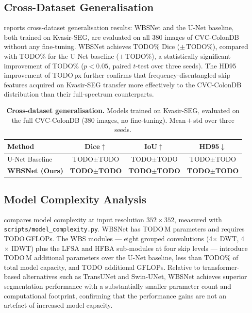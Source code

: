 \documentclass[journal]{IEEEtran}
\begin{document}
\subsection{Cross-Dataset Generalisation}\label{sec:exp:generalisation}

 reports cross-dataset generalisation results:
WBSNet and the U-Net baseline, both trained on Kvasir-SEG, are evaluated
on all 380 images of CVC-ColonDB without any fine-tuning.
WBSNet achieves TODO\% Dice ($\pm$\,TODO\%), compared with TODO\% for the
U-Net baseline ($\pm$\,TODO\%), a statistically significant improvement of
TODO\% ($p < 0.05$, paired $t$-test over three seeds).
The HD95 improvement of TODO\,px further confirms that frequency-disentangled
skip features acquired on Kvasir-SEG transfer more effectively to the
CVC-ColonDB distribution than their full-spectrum counterparts.

\begin{table}[t]
  \centering
  \caption{\textbf{Cross-dataset generalisation.}
    Models trained on Kvasir-SEG, evaluated on the full CVC-ColonDB
    (380 images, no fine-tuning).
    Mean\,$\pm$\,std over three seeds.}
  \label{tab:generalisation}
  \begin{tabular}{@{}lccc@{}}
    \toprule
    Method & Dice$\uparrow$ & IoU$\uparrow$ & HD95$\downarrow$ \\
    \midrule
    U-Net Baseline
        & TODO$\pm$TODO & TODO$\pm$TODO & TODO$\pm$TODO \\
    \textbf{WBSNet (Ours)}
        & \textbf{TODO$\pm$TODO}
        & \textbf{TODO$\pm$TODO}
        & \textbf{TODO$\pm$TODO} \\
    \bottomrule
  \end{tabular}
\end{table}

\subsection{Model Complexity Analysis}\label{sec:exp:complexity}

 compares model complexity at input resolution
$352 \times 352$, measured with \texttt{scripts/model\_complexity.py}.
WBSNet has TODO\,M parameters and requires TODO\,GFLOPs.
The WBS modules --- eight grouped convolutions (4$\times$ DWT, 4$\times$ IDWT)
plus the LFSA and HFBA sub-modules at four skip levels --- introduce
TODO\,M additional parameters over the U-Net baseline, less than TODO\% of
total model capacity, and TODO additional GFLOPs.
Relative to transformer-based alternatives such as TransUNet and Swin-UNet,
WBSNet achieves superior segmentation performance with a substantially smaller
parameter count and computational footprint, confirming that the performance
gains are not an artefact of increased model capacity.
\end{document}
